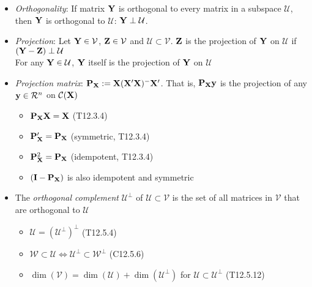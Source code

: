 \documentclass[a4paper, oneside]{book}
\begin{document}
\begin{itemize}
\item \textit{Orthogonality}: If matrix $\mathbf{Y}$ is orthogonal to every matrix in a subspace $\mathcal{U}$, then $\mathbf{Y}$ is orthogonal to $\mathcal{U}$: $\mathbf{Y} \perp \mathcal{U}$.
\item \textit{Projection}: Let $\mathbf{Y} \in \mathcal{V}$, $\mathbf{Z}\in\mathcal{V}$ and $\mathcal{U} \subset \mathcal{V}$. $\mathbf{Z}$ is the projection of $\mathbf{Y}$ on $\mathcal{U}$ if $(\mathbf{Y-Z}) \perp \mathcal{U}$\\\hspace*{1.75cm} For any $\mathbf{Y} \in \mathcal{U}$, $\mathbf{Y}$ itself is the projection of $\mathbf{Y}$ on $\mathcal{U}$
\item \textit{Projection matrix}: $\mathbf{P_{X}}:=\mathbf{X(X'X)^-X'}$. That is, $\mathbf{P}_{\mathbf{X}}\mathbf{y}$ is the projection of any $\mathbf{y} \in \mathcal{R}^n$ on $\mathcal{C}(\mathbf{X})$
	\begin{itemize}
	\item $\mathbf{P}_\mathbf{X}\mathbf{X}=\mathbf{X}$ (T12.3.4)
	\item $\mathbf{P}_\mathbf{X}' = \mathbf{P}_\mathbf{X}$ (\ie symmetric, T12.3.4)
	\item $\mathbf{P}_\mathbf{X}^2 = \mathbf{P}_\mathbf{X}$ (\ie idempotent, T12.3.4)
	\item $(\mathbf{I-P}_\mathbf{X})$ is also idempotent and symmetric
	\end{itemize}
\item The \textit{orthogonal complement} $\mathcal{U}^\perp$ of $\mathcal{U} \subset \mathcal{V}$ is the set of all matrices in $\mathcal{V}$ that are orthogonal to $\mathcal{U}$ 
	\begin{itemize}
	\item $\mathcal{U} = (\mathcal{U}^\perp)^\perp$ (T12.5.4)
	\item $\mathcal{W}\subset \mathcal{U} \iff \mathcal{U}^\perp \subset \mathcal{W}^\perp$ (C12.5.6)
	\item $\dim(\mathcal{V})=\dim(\mathcal{U})+\dim(\mathcal{U}^\perp)$ for $\mathcal{U}\subset \mathcal{U}^\perp$ (T12.5.12)
	\end{itemize}
\end{itemize}
\end{document}
